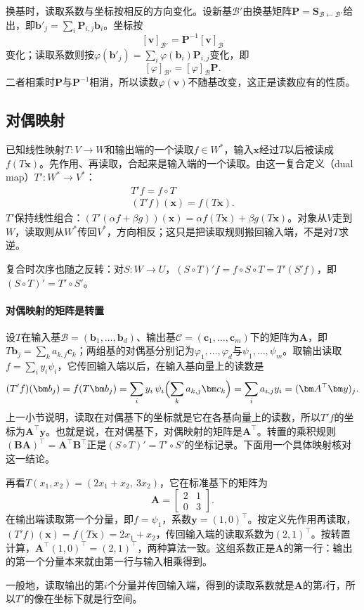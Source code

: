 换基时，读取系数与坐标按相反的方向变化。设新基$\mathcal B'$由换基矩阵$\bm P=\bm S_{\mathcal B\leftarrow\mathcal B'}$给出，即$\bm b'_j=\sum_i\bm P_{i,j}\bm b_i$。坐标按
\[
 [\bm v]_{\mathcal B'}=\bm P^{-1}[\bm v]_{\mathcal B}
\]
变化；读取系数则按$\varphi(\bm b'_j)=\sum_i\varphi(\bm b_i)\bm P_{i,j}$变化，即
\[
 [\varphi]_{\mathcal B'}=[\varphi]_{\mathcal B}\bm P.
\]
二者相乘时$\bm P$与$\bm P^{-1}$相消，所以读数$\varphi(\bm v)$不随基改变，这正是读数应有的性质。

\subsection{对偶映射}
\label{sec:ls-dual-map}

已知线性映射$T:V\to W$和输出端的一个读取$f\in W^*$，输入$\bm x$经过$T$以后被读成$f(T\bm x)$。先作用、再读取，合起来是输入端的一个读取。由这一复合定义（dual map）$T':W^*\to V^*$：
\begin{equation}
\begin{gathered}
T'f=f\circ T\\
(T'f)(\bm x)=f(T\bm x).
\end{gathered}
\label{eq:ls-dual-map-def}
\end{equation}
$T'$保持线性组合：$(T'(\alpha f+\beta g))(\bm x)=\alpha f(T\bm x)+\beta g(T\bm x)$。对象从$V$走到$W$，读取则从$W^*$传回$V^*$，方向相反；这只是把读取规则搬回输入端，不是对$T$求逆。

复合时次序也随之反转：对$S:W\to U$，$(S\circ T)'f=f\circ S\circ T=T'(S'f)$，即$(S\circ T)'=T'\circ S'$。

\paragraph{对偶映射的矩阵是转置}
设$T$在输入基$\mathcal B=(\bm b_1,\ldots,\bm b_d)$、输出基$\mathcal C=(\bm c_1,\ldots,\bm c_m)$下的矩阵为$\bm A$，即$T\bm b_j=\sum_ka_{k,j}\bm c_k$；两组基的对偶基分别记为$\varphi_1,\ldots,\varphi_d$与$\psi_1,\ldots,\psi_m$。取输出读取$f=\sum_iy_i\psi_i$，它传回输入端以后，在输入基向量上的读数是
\[
 (T'f)(\bm b_j)=f(T\bm b_j)
 =\sum_iy_i\,\psi_i\Bigl(\sum_ka_{k,j}\bm c_k\Bigr)
 =\sum_ia_{i,j}y_i=(\bm A^\top\bm y)_j .
\]
上一小节说明，读取在对偶基下的坐标就是它在各基向量上的读数，所以$T'f$的坐标为$\bm A^\top\bm y$。也就是说，在对偶基下，对偶映射的矩阵是$\bm A^\top$。转置的乘积规则$(\bm B\bm A)^\top=\bm A^\top\bm B^\top$正是$(S\circ T)'=T'\circ S'$的坐标记录。下面用一个具体映射核对这一结论。
\begin{example}[把输出的第一个分量读取传回输入端]
\label{ex:ls-dual-map-first-component}
再看$T(x_1,x_2)=(2x_1+x_2,\ 3x_2)$，它在标准基下的矩阵为
\[
 \bm A=\begin{bmatrix}2&1\\0&3\end{bmatrix}.
\]
在输出端读取第一个分量，即$f=\psi_1$，系数$\bm y=(1,0)^\top$。按定义先作用再读取，$(T'f)(\bm x)=f(T\bm x)=2x_1+x_2$，传回输入端的读取系数为$(2,1)^\top$。按转置计算，$\bm A^\top(1,0)^\top=(2,1)^\top$，两种算法一致。这组系数正是$\bm A$的第一行：输出的第一个分量本来就由第一行与输入相乘得到。
\end{example}
一般地，读取输出的第$i$个分量并传回输入端，得到的读取系数就是$\bm A$的第$i$行，所以$T'$的像在坐标下就是行空间。

